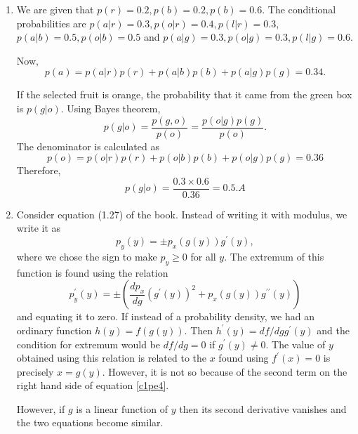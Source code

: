 \begin{enumerate}
\item We are given that $p(r) = 0.2, p(b) = 0.2, p(b) = 0.6$. The conditional probabilities are
$p(a|r) = 0.3, p(o|r) = 0.4, p(l|r) = 0.3$, $p(a|b) = 0.5, p(o|b) = 0.5$ and $p(a|g) = 0.3, p(o|g)
= 0.3, p(l|g) = 0.6$.

Now, 
\[
p(a) = p(a|r)p(r) + p(a|b)p(b) + p(a|g)p(g) = 0.34.
\]

If the selected fruit is orange, the probability that it came from the green box is $p(g|o)$. Using
Bayes theorem,
\[
p(g|o) = \frac{p(g, o)}{p(o)} = \frac{p(o|g)p(g)}{p(o)}.
\]
The denominator is calculated as
\[
p(o) = p(o|r)p(r) + p(o|b)p(b) + p(o|g)p(g) = 0.36
\]
Therefore,
\[
p(g|o) = \frac{0.3 \times 0.6}{0.36} = 0.5.A
\]

\item Consider equation (1.27) of the book. Instead of writing it with modulus, we write it as
\[
p_y(y) = \pm p_x(g(y))g^\prime(y),
\]
where we chose the sign to make $p_y \ge 0$ for all $y$. The extremum of this function is found
using the relation
\begin{equation}\label{c1pe4}
p_y^\prime(y) = \pm\left(\frac{dp_x}{dg}\left(g^\prime(y)\right)^2 + p_x(g(y))g^{\prime\prime}(y)\right)
\end{equation}
and equating it to zero. If instead of a probability density, we had an ordinary
function $h(y) = f(g(y))$. Then $h^\prime(y) = df/dg g^\prime(y)$ and the condition for extremum
would be $df/dg = 0$ if $g^\prime(y) \ne 0$. The value of $y$ obtained using this relation
is related to the $x$ found using $f^\prime(x) = 0$ is precisely $x = g(y)$. However, it
is not so because of the second term on the right hand side of equation \eqref{c1pe4}.

However, if $g$ is a linear function of $y$ then its second derivative vanishes and the two
equations become similar.
\end{enumerate}
